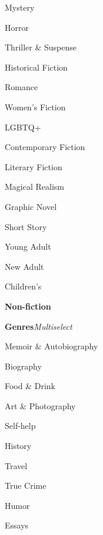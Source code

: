 \begin{CompactItemize}
\begin{CompactItemize}
\begin{CompactItemize}
\begin{CompactItemize}
\begin{CompactItemize}
\begin{CompactItemize}
                        \item Mystery
                        \item Horror
                        \item Thriller \& Suspense
                        \item Historical Fiction
                        \item Romance
                        \item Women's Fiction
                        \item LGBTQ+
                        \item Contemporary Fiction
                        \item Literary Fiction
                        \item Magical Realism
                        \item Graphic Novel
                        \item Short Story
                        \item Young Adult
                        \item New Adult
                        \item Children's
                    \end{CompactItemize}
                \end{CompactItemize}
                \item \textbf{Non-fiction}
                \begin{CompactItemize}
                    \item\label{cco:nonfiction_genres} \textbf{Genres}\quad\textit{Multiselect}
                    \begin{CompactItemize}
                        \item Memoir \& Autobiography
                        \item Biography
                        \item Food \& Drink
                        \item Art \& Photography
                        \item Self-help
                        \item History
                        \item Travel
                        \item True Crime
                        \item Humor
                        \item Essays

\end{CompactItemize}
\end{CompactItemize}
\end{CompactItemize}
\end{CompactItemize}
\end{CompactItemize}
\end{CompactItemize}
